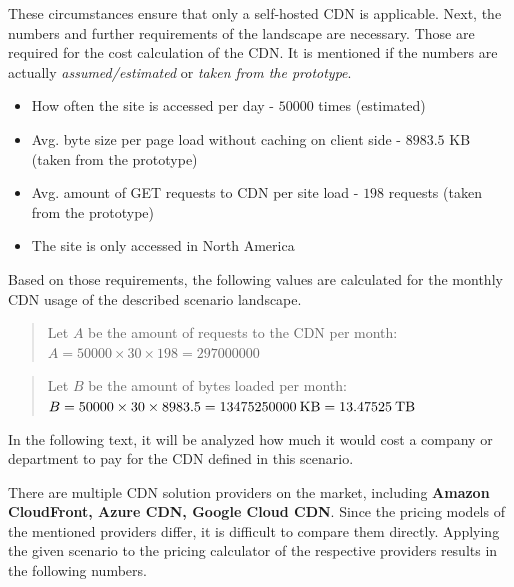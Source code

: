 These circumstances ensure that only a self-hosted CDN is applicable.
Next, the numbers and further requirements of the landscape are necessary. Those are required for the cost calculation of the CDN.
It is mentioned if the numbers are actually \textit{assumed/estimated} or \textit{taken from the prototype}.

\begin{itemize}[noitemsep]
	\item How often the site is accessed per day - $50 000$ times (estimated)
	\item Avg. byte size per page load without caching on client side - $8983.5$ KB (taken from the prototype)
	\item Avg. amount of GET requests to CDN per site load - $198$ requests (taken from the prototype)
	\item The site is only accessed in North America 
\end{itemize} 

Based on those requirements, the following values are calculated for the monthly CDN usage of the described scenario landscape.

\begin{quote}
	\begin{center}
		Let $A$ be the amount of requests to the CDN per month:
		\begin{math}
			A = 50000 \times 30 \times 198 = 297000000
		\end{math}
	\end{center} 
\end{quote}

\begin{quote}
	\begin{center}
		Let $B$ be the amount of bytes loaded per month:
		\begin{math}
			B = 50000 \times 30 \times 8983.5 = 13475250000 \: $KB$ \; = 13.47525 \: $TB$
		\end{math}
	\end{center} 
\end{quote}

In the following text, it will be analyzed how much it would cost a company or department to pay for the CDN defined in this scenario.

There are multiple CDN solution providers on the market, including \textbf{Amazon CloudFront, Azure CDN, Google Cloud CDN}. \cite{top_10_cdn}
Since the pricing models of the mentioned providers differ, it is difficult to compare them directly. Applying the given scenario to the pricing calculator of the respective providers results in the following numbers.

